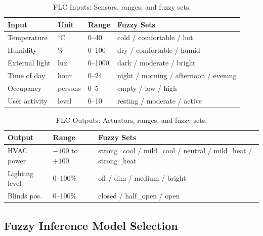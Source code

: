 \documentclass[10pt,twocolumn,a4paper]{article}
\begin{document}
\begin{table}[H]
  \centering
  \caption{FLC Inputs: Sensors, ranges, and fuzzy sets.}
  \label{tab:inputs}
  \scriptsize
  \begin{tabularx}{\columnwidth}{lllX}
    \toprule
    \textbf{Input} & \textbf{Unit} & \textbf{Range} & \textbf{Fuzzy Sets} \\
    \midrule
    Temperature      & $^\circ$C   & 0--40    & cold / comfortable / hot \\
    Humidity         & \%          & 0--100   & dry / comfortable / humid \\
    External light   & lux         & 0--1000  & dark / moderate / bright \\
    Time of day      & hour        & 0--24    & night / morning / afternoon / evening \\
    Occupancy        & persons     & 0--5     & empty / low / high \\
    User activity    & level       & 0--10    & resting / moderate / active \\
    \bottomrule
  \end{tabularx}
\end{table}

\begin{table}[H]
  \centering
  \caption{FLC Outputs: Actuators, ranges, and fuzzy sets.}
  \label{tab:outputs}
  \scriptsize
  \begin{tabularx}{\columnwidth}{llX}
    \toprule
    \textbf{Output} & \textbf{Range} & \textbf{Fuzzy Sets} \\
    \midrule
    HVAC power     & $-100$ to $+100$ & strong\_cool / mild\_cool / neutral / mild\_heat / strong\_heat \\
    Lighting level & 0--100\%         & off / dim / medium / bright \\
    Blinds pos.    & 0--100\%         & closed / half\_open / open \\
    \bottomrule
  \end{tabularx}
\end{table}

\subsection{Fuzzy Inference Model Selection}
\end{document}
